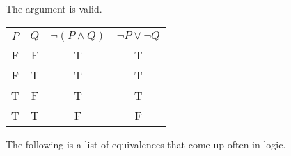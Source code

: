 The argument is valid.


\begin{center} 
  \begin{tabular}{|c|c|c|c|}
    \hline
    $P$ & $Q$ & $\neg (P \land Q)$ & $\neg P \lor \neg Q$ \\
    \hline 
    F & F & T & T\\   
    F & T & T & T\\
    T & F & T & T\\
    T & T & F & F\\
    \hline
  \end{tabular}
\end{center}

The following is a list of equivalences that come up often in logic.




